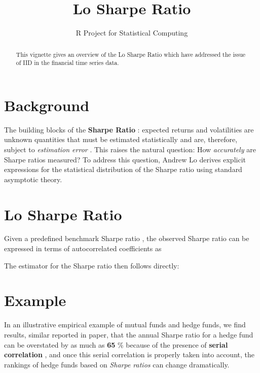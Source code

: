 \documentclass[12pt,letterpaper,english]{article}
\begin{document}


\title{ Lo Sharpe Ratio }
\author{R Project for Statistical Computing}

\makeatletter
\makeatother
\maketitle

\begin{abstract}

    This vignette gives an overview of the Lo Sharpe Ratio which have addressed the issue of IID in the financial time series data.
\end{abstract}



\section{Background}
The building blocks of the \textbf{Sharpe Ratio} : expected returns and volatilities  are unknown quantities that must be estimated statistically and are,
therefore, subject to \emph{estimation error} . This raises the natural question: How
\emph{accurately} are Sharpe ratios measured? To address this question, Andrew Lo derives explicit expressions for the statistical distribution of the Sharpe ratio using
standard asymptotic theory. 


\section{Lo Sharpe Ratio}
 Given a predefined benchmark Sharpe ratio , the observed Sharpe ratio       can be expressed in terms of autocorrelated coefficients as
 
 
The estimator for the Sharpe ratio then follows directly:
\section{Example}

In an illustrative
empirical example of mutual funds and hedge funds, we find results, similar reported in paper, that the annual Sharpe ratio for a hedge fund can be overstated by as much as \textbf{65} \% because of the presence of \textbf{serial correlation} , and once
this serial correlation is properly taken into account, the rankings of hedge
funds based on \emph{Sharpe ratios} can change dramatically.
\end{document}

